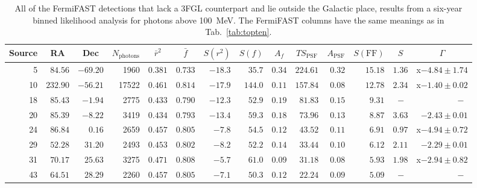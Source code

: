 \documentclass[useAMS,usenatbib]{mn2e}
\begin{document}
\begin{table}
  \caption{ All of the FermiFAST detections that lack a 3FGL
    counterpart and lie outside the Galactic place, results from a
    six-year binned likelihood analysis for photons above 100~MeV.
    The FermiFAST columns have the same meanings as in
    Tab.~\ref{tab:topten}.}
  \label{tab:fermisig100MeV}
\begin{tabular}{rrrrrrrrrrrrrr}
    \hline
    \multicolumn{1}{c}{Source} & \multicolumn{1}{c}{RA} & \multicolumn{1}{c}{Dec}  & \multicolumn{1}{c}{$N_\mathrm{photons}$}  &\multicolumn{1}{c}{$\bar r^2$} & \multicolumn{1}{c}{$\bar f$} & \multicolumn{1}{c}{$S(r^2)$} & \multicolumn{1}{c}{$S(f)$} & \multicolumn{1}{c}{$A_f$} & \multicolumn{1}{c}{$TS_\mathrm{PSF}$} & \multicolumn{1}{c}{$A_\mathrm{PSF}$} & \multicolumn{1}{c}{$S(\mathrm{FF})$} & \multicolumn{1}{c}{$S$}  & \multicolumn{1}{c}{$\Gamma$} 
 \\
 \hline
 5 & $ 84.56$ & $-69.20$ &   1960 & $0.381$ & $0.733$ & $ -18.3$ & $  35.7$ & $0.34$ & $   224.61$ & $0.32$ & $    15.18$ & $1.36$ & x$-4.84\pm1.74$ \\ 
10 & $232.90$ & $-56.21$ &  17522 & $0.461$ & $0.814$ & $ -17.9$ & $ 144.0$ & $0.11$ & $   157.84$ & $0.08$ & $    12.78$ & $2.34$ & x$-1.40\pm0.02$ \\ 
18 & $ 85.43$ & $ -1.94$ &   2775 & $0.433$ & $0.790$ & $ -12.3$ & $  52.9$ & $0.19$ & $    81.83$ & $0.15$ & $     9.31$ & $~-~$    & $~-~$ \\ 
20 & $ 85.39$ & $ -8.22$ &   3419 & $0.434$ & $0.793$ & $ -13.4$ & $  59.3$ & $0.18$ & $    73.96$ & $0.13$ & $     8.87$ & $3.63$ & $-2.43\pm0.01$ \\ 
24 & $ 86.84$ & $  0.16$ &   2659 & $0.457$ & $0.805$ & $  -7.8$ & $  54.5$ & $0.12$ & $    43.52$ & $0.11$ & $     6.91$ & $0.97$ & x$-4.94\pm0.72$ \\ 
29 & $ 52.28$ & $ 31.20$ &   2493 & $0.453$ & $0.802$ & $  -8.2$ & $  52.2$ & $0.14$ & $    33.44$ & $0.10$ & $     6.12$ & $2.11$ & $-2.29\pm0.01$ \\ 
31 & $ 70.17$ & $ 25.63$ &   3275 & $0.471$ & $0.808$ & $  -5.7$ & $  61.0$ & $0.09$ & $    31.18$ & $0.08$ & $     5.93$ & $1.98$ & x$-2.94\pm0.82$ \\
43 & $ 64.51$ & $ 28.29$ &   2260 & $0.457$ & $0.805$ & $  -7.1$ & $  50.3$ & $0.12$ & $    22.24$ & $0.09$ & $     5.09$ & $~-~$    & $~-~$ \\ 
\end{tabular}
\end{table}
\end{document}
